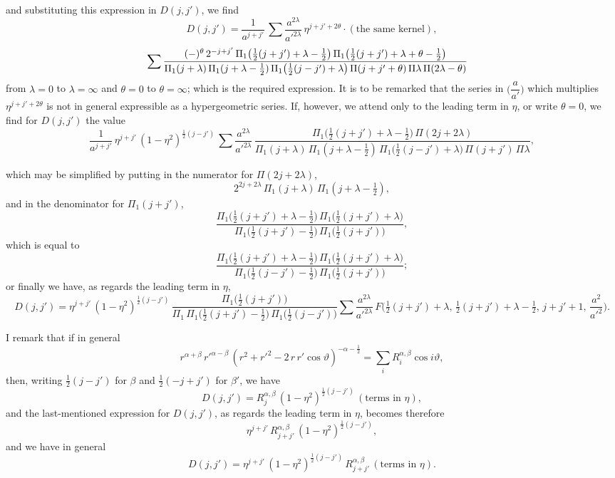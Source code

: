 \documentclass[12pt,a4paper]{article}
\theoremstyle{plain}
\begin{document}
and substituting this expression in $D(j,j')$, we find
\[
D(j,j')=\dfrac{1}{a^{j+j'}}\,\sum\dfrac{a^{2\lambda}}{a'^{2\lambda}}\,\eta^{j+j'+2\theta}\cdot(\text{the same kernel}),
\]
\[
\hspace{-1em}\sum\dfrac{(-)^{\theta}\,2^{-j+j'}\,\Pi_{1}\bigl(\tfrac{1}{2}(j+j')+\lambda-\tfrac{1}{2}\bigr)\,\Pi_{1}\bigl(\tfrac{1}{2}(j+j')+\lambda+\theta-\tfrac{1}{2}\bigr)}{\Pi_{1}(j+\lambda)\,\Pi_{1}(j+\lambda-\tfrac{1}{2})\,\Pi_{1}\bigl(\tfrac{1}{2}(j-j')+\lambda\bigr)\,\Pi(j+j'+\theta)\,\Pi\lambda\,\Pi(2\lambda-\theta)}
\]
from $\lambda=0$ to $\lambda=\infty$ and $\theta=0$ to $\theta=\infty$; which is the required expression. It is to be remarked that the series in $\bigl(\dfrac{a}{a'}\bigr)$ which multiplies $\eta^{j+j'+2\theta}$ is not in general expressible as a hypergeometric series. If, however, we attend only to the leading term in $\eta$, or write $\theta=0$, we find for $D(j,j')$ the value
\[
\dfrac{1}{a^{j+j'}}\,\eta^{j+j'}\,(1-\eta^{2})^{\frac{1}{2}(j-j')}\,\sum\dfrac{a^{2\lambda}}{a'^{2\lambda}}\,\dfrac{\Pi_{1}\bigl(\tfrac{1}{2}(j+j')+\lambda-\tfrac{1}{2}\bigr)\,\Pi(2j+2\lambda)}{\Pi_{1}(j+\lambda)\,\Pi_{1}(j+\lambda-\tfrac{1}{2})\,\Pi_{1}\bigl(\tfrac{1}{2}(j-j')+\lambda\bigr)\,\Pi(j+j')\,\Pi\lambda},
\]

\newpage
{} which may be simplified by putting in the numerator for $\Pi(2j+2\lambda)$,
\[
2^{2j+2\lambda}\,\Pi_{1}(j+\lambda)\,\Pi_{1}(j+\lambda-\tfrac{1}{2}),
\]
and in the denominator for $\Pi_{1}(j+j')$,
\[
\dfrac{\Pi_{1}\bigl(\tfrac{1}{2}(j+j')+\lambda-\tfrac{1}{2}\bigr)\,\Pi_{1}\bigl(\tfrac{1}{2}(j+j')+\lambda\bigr)}{\Pi_{1}\bigl(\tfrac{1}{2}(j+j')-\tfrac{1}{2}\bigr)\,\Pi_{1}\bigl(\tfrac{1}{2}(j+j')\bigr)},
\]
which is equal to
\[
\dfrac{\Pi_{1}\bigl(\tfrac{1}{2}(j+j')+\lambda-\tfrac{1}{2}\bigr)\,\Pi_{1}\bigl(\tfrac{1}{2}(j+j')+\lambda\bigr)}{\Pi_{1}\bigl(\tfrac{1}{2}(j-j')-\tfrac{1}{2}\bigr)\,\Pi_{1}\bigl(\tfrac{1}{2}(j+j')\bigr)};
\]
or finally we have, as regards the leading term in $\eta$,
\[
D(j,j')=\eta^{j+j'}\,(1-\eta^{2})^{\frac{1}{2}(j-j')}\,\dfrac{\Pi_{1}\bigl(\tfrac{1}{2}(j+j')\bigr)}{\Pi_{1}\,\Pi_{1}\bigl(\tfrac{1}{2}(j+j')-\tfrac{1}{2}\bigr)\,\Pi_{1}\bigl(\tfrac{1}{2}(j-j')\bigr)}\sum\dfrac{a^{2\lambda}}{a'^{2\lambda}}\,F\bigl(\tfrac{1}{2}(j+j')+\lambda,\,\tfrac{1}{2}(j+j')+\lambda-\tfrac{1}{2},\,j+j'+1,\,\dfrac{a^{2}}{a'^{2}}\bigr).
\]

\medskip
\noindent I remark that if in general
\[
r^{\alpha+\beta}\,r'^{\alpha-\beta}\,(r^{2}+r'^{2}-2\,r\,r'\cos\vartheta)^{-\alpha-\tfrac{1}{2}}=\sum_{i}R_{i}^{\alpha,\beta}\cos i\vartheta,
\]
then, writing $\tfrac{1}{2}(j-j')$ for $\beta$ and $\tfrac{1}{2}(-j+j')$ for $\beta'$, we have
\[
D(j,j')=R_{j}^{\alpha,\beta}\,(1-\eta^{2})^{\frac{1}{2}(j-j')}\,(\text{terms in }\eta),
\]
and the last-mentioned expression for $D(j,j')$, as regards the leading term in $\eta$, becomes therefore
\[
\eta^{j+j'}\,R_{j+j'}^{\alpha,\beta}\,(1-\eta^{2})^{\frac{1}{2}(j-j')},
\]
and we have in general
\[
D(j,j')=\eta^{j+j'}\,(1-\eta^{2})^{\frac{1}{2}(j-j')}\,R_{j+j'}^{\alpha,\beta}\,(\text{terms in }\eta).
\]
\end{document}
